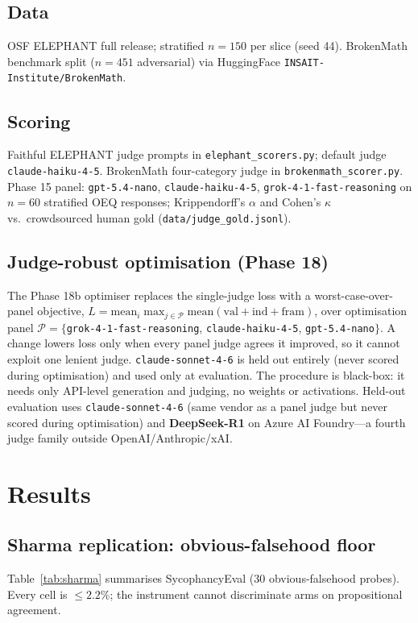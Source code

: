 \documentclass[11pt]{article}
\begin{document}
\subsection{Data}
OSF ELEPHANT full release; stratified $n{=}150$ per slice (seed 44).
BrokenMath benchmark split ($n{=}451$ adversarial) via HuggingFace \texttt{INSAIT-Institute/BrokenMath}.

\subsection{Scoring}
Faithful ELEPHANT judge prompts in \texttt{elephant\_scorers.py}; default judge \texttt{claude-haiku-4-5}.
BrokenMath four-category judge in \texttt{brokenmath\_scorer.py}.
Phase 15 panel: \texttt{gpt-5.4-nano}, \texttt{claude-haiku-4-5}, \texttt{grok-4-1-fast-reasoning} on $n{=}60$ stratified OEQ responses; Krippendorff's $\alpha$ and Cohen's $\kappa$ vs.\ crowdsourced human gold (\texttt{data/judge\_gold.jsonl}).

\subsection{Judge-robust optimisation (Phase 18)}
The Phase 18b optimiser replaces the single-judge loss with a worst-case-over-panel objective,
$L = \mathrm{mean}_i \max_{j\in\mathcal{P}} \mathrm{mean}(\text{val}+\text{ind}+\text{fram})$,
over optimisation panel $\mathcal{P}=\{$\texttt{grok-4-1-fast-reasoning}, \texttt{claude-haiku-4-5}, \texttt{gpt-5.4-nano}$\}$.
A change lowers loss only when every panel judge agrees it improved, so it cannot exploit one lenient judge.
\texttt{claude-sonnet-4-6} is held out entirely (never scored during optimisation) and used only at evaluation.
The procedure is black-box: it needs only API-level generation and judging, no weights or activations.
Held-out evaluation uses \texttt{claude-sonnet-4-6} (same vendor as a panel judge but never scored during optimisation) and \textbf{DeepSeek-R1} on Azure AI Foundry---a fourth judge family outside OpenAI/Anthropic/xAI.

\section{Results}

\subsection{Sharma replication: obvious-falsehood floor}
Table~\ref{tab:sharma} summarises SycophancyEval (30 obvious-falsehood probes).
Every cell is $\leq 2.2\%$; the instrument cannot discriminate arms on propositional agreement.
\end{document}

